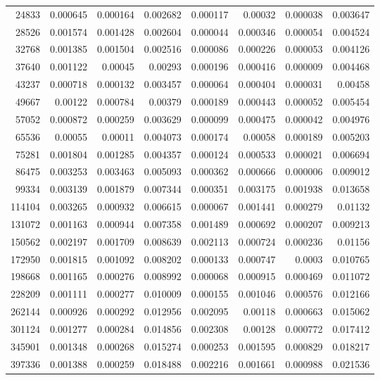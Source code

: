 \begin{longtable}{r r r r r r r r}
24833 & 0.000645 & 0.000164 & 0.002682 & 0.000117 & 0.00032 & 0.000038 & 0.003647 \\
28526 & 0.001574 & 0.001428 & 0.002604 & 0.000044 & 0.000346 & 0.000054 & 0.004524 \\
32768 & 0.001385 & 0.001504 & 0.002516 & 0.000086 & 0.000226 & 0.000053 & 0.004126 \\
37640 & 0.001122 & 0.00045 & 0.00293 & 0.000196 & 0.000416 & 0.000009 & 0.004468 \\
43237 & 0.000718 & 0.000132 & 0.003457 & 0.000064 & 0.000404 & 0.000031 & 0.00458 \\
49667 & 0.00122 & 0.000784 & 0.00379 & 0.000189 & 0.000443 & 0.000052 & 0.005454 \\
57052 & 0.000872 & 0.000259 & 0.003629 & 0.000099 & 0.000475 & 0.000042 & 0.004976 \\
65536 & 0.00055 & 0.00011 & 0.004073 & 0.000174 & 0.00058 & 0.000189 & 0.005203 \\
75281 & 0.001804 & 0.001285 & 0.004357 & 0.000124 & 0.000533 & 0.000021 & 0.006694 \\
86475 & 0.003253 & 0.003463 & 0.005093 & 0.000362 & 0.000666 & 0.000006 & 0.009012 \\
99334 & 0.003139 & 0.001879 & 0.007344 & 0.000351 & 0.003175 & 0.001938 & 0.013658 \\
114104 & 0.003265 & 0.000932 & 0.006615 & 0.000067 & 0.001441 & 0.000279 & 0.01132 \\
131072 & 0.001163 & 0.000944 & 0.007358 & 0.001489 & 0.000692 & 0.000207 & 0.009213 \\
150562 & 0.002197 & 0.001709 & 0.008639 & 0.002113 & 0.000724 & 0.000236 & 0.01156 \\
172950 & 0.001815 & 0.001092 & 0.008202 & 0.000133 & 0.000747 & 0.0003 & 0.010765 \\
198668 & 0.001165 & 0.000276 & 0.008992 & 0.000068 & 0.000915 & 0.000469 & 0.011072 \\
228209 & 0.001111 & 0.000277 & 0.010009 & 0.000155 & 0.001046 & 0.000576 & 0.012166 \\
262144 & 0.000926 & 0.000292 & 0.012956 & 0.002095 & 0.00118 & 0.000663 & 0.015062 \\
301124 & 0.001277 & 0.000284 & 0.014856 & 0.002308 & 0.00128 & 0.000772 & 0.017412 \\
345901 & 0.001348 & 0.000268 & 0.015274 & 0.000253 & 0.001595 & 0.000829 & 0.018217 \\
397336 & 0.001388 & 0.000259 & 0.018488 & 0.002216 & 0.001661 & 0.000988 & 0.021536 \\

\end{longtable}
